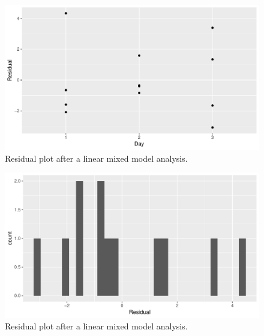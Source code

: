 \documentclass[]{report}\usepackage[]{graphicx}\usepackage[]{color}
\makeatletter
\def\maxwidth{ %
  \ifdim\Gin@nat@width>\linewidth
    \linewidth
  \else
    \Gin@nat@width
  \fi
}
\newenvironment{knitrout}{}{} %
\makeatother
\begin{document}
\begin{enumerate}
\begin{knitrout}
\begin{figure}
{\centering \includegraphics[width=\maxwidth]{figure/nonparmixed_11a-1} 

}

\caption[Residual plot after a linear mixed model analysis]{Residual plot after a linear mixed model analysis.}\label{fig:nonparmixed_11a1}
\end{figure}

\begin{figure}

{\centering \includegraphics[width=\maxwidth]{figure/nonparmixed_11a-2} 

}

\caption[Residual plot after a linear mixed model analysis]{Residual plot after a linear mixed model analysis.}\label{fig:nonparmixed_11a2}
\end{figure}


\end{knitrout}

\begin{knitrout}
\color{fgcolor}\begin{figure}


\end{figure}
\end{knitrout}
\end{enumerate}
\end{document}

